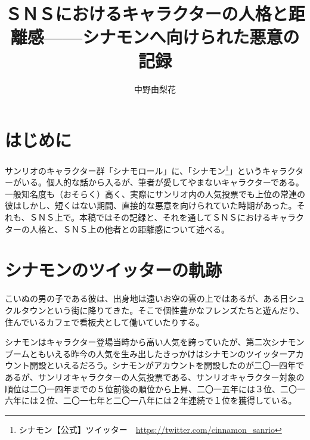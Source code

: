 \documentclass[b5j,twoside,twocolumn]{utarticle}
\title{\tbaselineshift =4.0pt ＳＮＳにおけるキャラクターの人格と距離感------シナモンへ向けられた悪意の記録}
\author{中野由梨花}
\date{\vspace{-5mm}}
\makeatletter
\def\yakuchu{%
\@ifnextchar[\@xfootnote %
{\stepcounter{yakuchu}%
\protected@xdef\@thefnmark{\theyakuchu}%
\@footnotemark\@footnotetext}}
\makeatother
\begin{document}
\maketitle

\setlength{\footskip}{-2mm}
\chead[]{}
\lfoot[]{\thepage{}}
\cfoot[]{}
\rfoot[\thepage{}]{}

\let\yakuchu=\endnote
\renewcommand{\footnoterule}{\noindent\rule{100mm}{0.3mm}\vskip2mm}
\thispagestyle{fancy}
\section*{はじめに}
サンリオのキャラクター群「シナモロール」に、「シナモン\footnote{シナモン【公式】ツイッター　\url{https://twitter.com/cinnamon_sanrio}}」というキャラクターがいる。個人的な話から入るが、筆者が愛してやまないキャラクターである。一般知名度も（おそらく）高く、実際にサンリオ内の人気投票でも上位の常連の彼はしかし、短くはない期間、直接的な悪意を向けられていた時期があった。それも、ＳＮＳ上で。本稿ではその記録と、それを通してＳＮＳにおけるキャラクターの人格と、ＳＮＳ上の他者との距離感について述べる。

\section*{シナモンのツイッターの軌跡}
こいぬの男の子である彼は、出身地は遠いお空の雲の上ではあるが、ある日シュクルタウンという街に降りてきた。そこで個性豊かなフレンズたちと遊んだり、住んでいるカフェで看板犬として働いていたりする。


シナモンはキャラクター登場当時から高い人気を誇っていたが、第二次シナモンブームともいえる昨今の人気を生み出したきっかけはシナモンのツイッターアカウント開設といえるだろう。シナモンがアカウントを開設したのが二〇一四年であるが、サンリオキャラクターの人気投票である、サンリオキャラクター対象の順位は二〇一四年までの５位前後の順位から上昇、二〇一五年には３位、二〇一六年には２位、二〇一七年と二〇一八年には２年連続で１位を獲得している。
\end{document}
